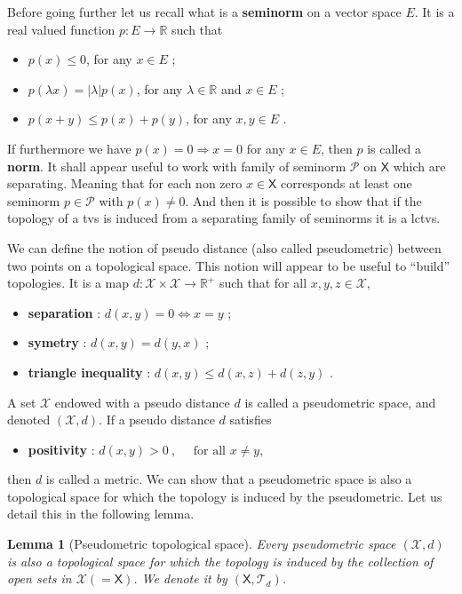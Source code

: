 \documentclass[10pt]{book}
\newcommand{\abs}[1]{\left|#1\right|}
\newcommand{\Pcal}{\mathcal{P}}
\newcommand{\Tcal}{\mathcal{T}}
\newcommand{\Xcal}{\mathcal{X}}
\newcommand{\Rbb}{\mathbb{R}}
\newcommand{\Xsf}{\mathsf{X}}
\theoremstyle{break}
\newtheorem{lemma}{Lemma}
\begin{document}
\bigskip


Before going further let us recall what is a \textbf{seminorm} on a vector space $E$. It is a real valued function $p : E \to \Rbb$ such that
%
\begin{itemize}
\item $p(x) \leq 0$, for any $x \in E$ ;
\item $p(\lambda x) = \abs{\lambda} p(x)$, for any $\lambda \in \Rbb$ and $x \in E$ ;
\item $p(x+y) \leq p(x) + p(y)$, for any $x, y \in E$ .
\end{itemize}
%
If furthermore we have $p(x) = 0 \Rightarrow x = 0$ for any $x \in E$, then $p$ is called a \textbf{norm}. It shall appear useful to work with family of seminorm $\Pcal$ on $\Xsf$ which are separating. Meaning that for each non zero $x \in \Xsf$ corresponds at least one seminorm $p \in \Pcal$ with $p(x) \neq 0$. And then it is possible to show that if the topology of a tvs is induced from a separating family of seminorms it is a lctvs.


\bigskip


We can define the notion of pseudo distance (also called pseudometric) between two points on a topological space. This notion will appear to be useful to ``build'' topologies. It is a map $d : \Xcal \times \Xcal \to \Rbb^+$ such that for all $x, y, z \in \Xcal$,%
%
\begin{itemize}
\item \textbf{separation} : $d(x,y) = 0 \Leftrightarrow x=y$ ; 
\item \textbf{symetry} : $d(x,y) = d(y,x)$ ;
\item \textbf{triangle inequality} : $d(x,y) \leq d(x,z) + d(z,y)$ .
\end{itemize}
%
A set $\Xcal$ endowed with a pseudo distance $d$ is called a pseudometric space, and denoted $(\Xcal,d)$. If a pseudo distance $d$ satisfies%
%
\begin{itemize}
\item \textbf{positivity} : $d(x,y) > 0 \ , \quad \mbox{ for all } x \neq y$,
\end{itemize}
%
then $d$ is called a metric. We can show that a pseudometric space is also a topological space for which the topology is induced by the pseudometric. Let us detail this in the following lemma.


\begin{lemma}[Pseudometric topological space]
Every pseudometric space $(\Xcal,d)$ is also a topological space for which the topology is induced by the collection of open sets in $\Xcal(=\Xsf)$. We denote it by $(\Xsf,\Tcal_d)$.
\end{lemma}
\end{document}
